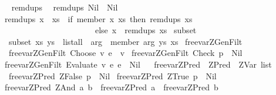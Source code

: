 \begin{isabellebody}
\ \isanewline
{}\isamarkupfalse%
\ remdups\isanewline
{}\isanewline
\ \ {\isachardoublequoteopen}remdups\ Nil\ {\isacharequal}\ Nil{\isachardoublequoteclose}\isanewline
{\isacharbar}\ {\isachardoublequoteopen}remdups\ {\isacharparenleft}x\ {\isacharhash}\ xs{\isacharparenright}\ {\isacharequal}\ {\isacharparenleft}if\ {\isacharparenleft}member\ x\ xs{\isacharparenright}\ then\ remdups\ xs\isanewline
\ \ \ \ \ \ \ \ \ \ \ \ \ \ \ \ \ \ \ \ \ \ \ else\ x\ {\isacharhash}\ remdups\ xs{\isacharparenright}{\isachardoublequoteclose}\isanewline
\isanewline
{}\isamarkupfalse%
\ subset\isanewline
{}\isanewline
\ \ {\isachardoublequoteopen}subset\ xs\ ys\ {\isacharequal}\ list{\isacharunderscore}all\ {\isacharparenleft}{\isacharpercent}\ arg{}\ {\isachardot}\ member\ arg{}\ ys{\isacharparenright}\ xs{\isachardoublequoteclose}%
\isamarkuptrue%
\isamarkupfalse%
\ free{\isacharunderscore}var{\isacharunderscore}ZGenFilt\isanewline
{}\isanewline
\ \ {\isachardoublequoteopen}free{\isacharunderscore}var{\isacharunderscore}ZGenFilt\ {\isacharparenleft}Choose\ v\ e{\isacharparenright}\ {\isacharequal}\ {\isacharbrackleft}v{\isacharbrackright}{\isachardoublequoteclose}\isanewline
{\isacharbar}\ {\isachardoublequoteopen}free{\isacharunderscore}var{\isacharunderscore}ZGenFilt\ {\isacharparenleft}Check\ p{\isacharparenright}\ {\isacharequal}\ Nil{\isachardoublequoteclose}\isanewline
{\isacharbar}\ {\isachardoublequoteopen}free{\isacharunderscore}var{\isacharunderscore}ZGenFilt\ {\isacharparenleft}Evaluate\ v\ e{}\ e{}{\isacharparenright}\ {\isacharequal}\ Nil{\isachardoublequoteclose}\isanewline
\isanewline
\ \isanewline
{}\isamarkupfalse%
\ free{\isacharunderscore}var{\isacharunderscore}ZPred\ {\isacharcolon}{\isacharcolon}\ {\isachardoublequoteopen}ZPred\ {\isasymRightarrow}\ ZVar\ list{\isachardoublequoteclose}\isanewline
{}\isanewline
\ \ {\isachardoublequoteopen}free{\isacharunderscore}var{\isacharunderscore}ZPred\ {\isacharparenleft}ZFalse\ p{\isacharparenright}\ {\isacharequal}\ Nil{\isachardoublequoteclose}\isanewline
{\isacharbar}\ {\isachardoublequoteopen}free{\isacharunderscore}var{\isacharunderscore}ZPred\ {\isacharparenleft}ZTrue\ p{\isacharparenright}\ {\isacharequal}\ Nil{\isachardoublequoteclose}\isanewline
{\isacharbar}\ {\isachardoublequoteopen}free{\isacharunderscore}var{\isacharunderscore}ZPred\ {\isacharparenleft}ZAnd\ a\ b{\isacharparenright}\ {\isacharequal}\ {\isacharparenleft}free{\isacharunderscore}var{\isacharunderscore}ZPred\ a\ {\isacharat}\ free{\isacharunderscore}var{\isacharunderscore}ZPred\ b{\isacharparenright}{\isachardoublequoteclose}\isanewline

\end{isabellebody}
